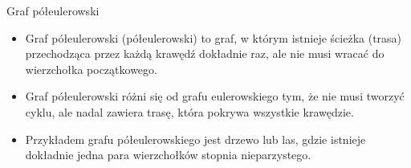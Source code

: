 \documentclass[polish,envcountsect,10pt]{beamer}
\begin{document}
\begin{frame}{Graf półeulerowski}
    \begin{itemize}
        \item Graf półeulerowski (półeulerowski) to graf, w którym istnieje ścieżka (trasa) przechodząca przez każdą krawędź dokładnie raz, ale nie musi wracać do wierzchołka początkowego.
        \item Graf półeulerowski różni się od grafu eulerowskiego tym, że nie musi tworzyć cyklu, ale nadal zawiera trasę, która pokrywa wszystkie krawędzie.
        \item Przykładem grafu półeulerowskiego jest drzewo lub las, gdzie istnieje dokładnie jedna para wierzchołków stopnia nieparzystego.
    \end{itemize}
    \begin{center}
    \end{center}
\end{frame}
\end{document}
